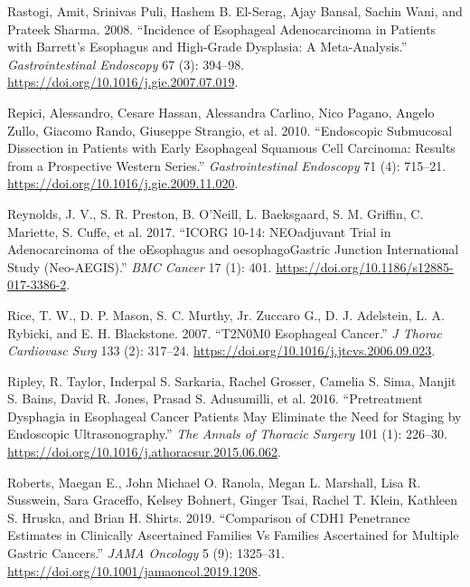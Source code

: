 \documentclass[
  letterpaper,
]{scrbook}
\newlength{\cslhangindent}
\newenvironment{CSLReferences}[2] %
 {\begin{list}{}{%
  \setlength{\itemindent}{0pt}
  \setlength{\leftmargin}{0pt}
  \setlength{\parsep}{0pt}
  \ifodd #1
   \setlength{\leftmargin}{\cslhangindent}
   \setlength{\itemindent}{-1\cslhangindent}
  \fi
  \setlength{\itemsep}{#2\baselineskip}}}
 {\end{list}}
\begin{document}
\begin{CSLReferences}{1}{0}
Rastogi, Amit, Srinivas Puli, Hashem B. El-Serag, Ajay Bansal, Sachin
Wani, and Prateek Sharma. 2008. {``Incidence of Esophageal
Adenocarcinoma in Patients with {Barrett}'s Esophagus and High-Grade
Dysplasia: A Meta-Analysis.''} \emph{Gastrointestinal Endoscopy} 67 (3):
394--98. \url{https://doi.org/10.1016/j.gie.2007.07.019}.

Repici, Alessandro, Cesare Hassan, Alessandra Carlino, Nico Pagano,
Angelo Zullo, Giacomo Rando, Giuseppe Strangio, et al. 2010.
{``Endoscopic Submucosal Dissection in Patients with Early Esophageal
Squamous Cell Carcinoma: Results from a Prospective {Western} Series.''}
\emph{Gastrointestinal Endoscopy} 71 (4): 715--21.
\url{https://doi.org/10.1016/j.gie.2009.11.020}.

Reynolds, J. V., S. R. Preston, B. O'Neill, L. Baeksgaard, S. M.
Griffin, C. Mariette, S. Cuffe, et al. 2017. {``{ICORG} 10-14:
{NEOadjuvant} Trial in {Adenocarcinoma} of the {oEsophagus} and
{oesophagoGastric} Junction {International} {Study} ({Neo}-{AEGIS}).''}
\emph{BMC Cancer} 17 (1): 401.
\url{https://doi.org/10.1186/s12885-017-3386-2}.

Rice, T. W., D. P. Mason, S. C. Murthy, Jr. Zuccaro G., D. J. Adelstein,
L. A. Rybicki, and E. H. Blackstone. 2007. {``{T2N0M0} Esophageal
Cancer.''} \emph{J Thorac Cardiovasc Surg} 133 (2): 317--24.
\url{https://doi.org/10.1016/j.jtcvs.2006.09.023}.

Ripley, R. Taylor, Inderpal S. Sarkaria, Rachel Grosser, Camelia S.
Sima, Manjit S. Bains, David R. Jones, Prasad S. Adusumilli, et al.
2016. {``Pretreatment {Dysphagia} in {Esophageal} {Cancer} {Patients}
{May} {Eliminate} the {Need} for {Staging} by {Endoscopic}
{Ultrasonography}.''} \emph{The Annals of Thoracic Surgery} 101 (1):
226--30. \url{https://doi.org/10.1016/j.athoracsur.2015.06.062}.

Roberts, Maegan E., John Michael O. Ranola, Megan L. Marshall, Lisa R.
Susswein, Sara Graceffo, Kelsey Bohnert, Ginger Tsai, Rachel T. Klein,
Kathleen S. Hruska, and Brian H. Shirts. 2019. {``Comparison of {CDH1}
{Penetrance} {Estimates} in {Clinically} {Ascertained} {Families} Vs
{Families} {Ascertained} for {Multiple} {Gastric} {Cancers}.''}
\emph{JAMA Oncology} 5 (9): 1325--31.
\url{https://doi.org/10.1001/jamaoncol.2019.1208}.


\end{CSLReferences}
\end{document}
